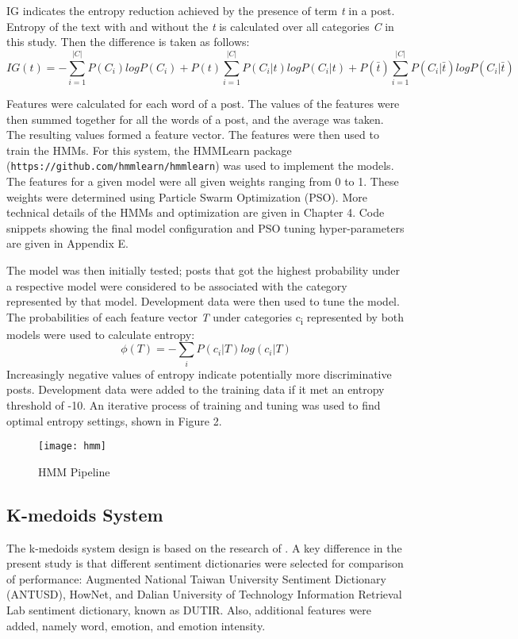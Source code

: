 \documentclass [11pt, proquest] {uwthesis}[2020/02/24]
\begin{document}
IG indicates the entropy reduction achieved by the presence of term \textit{t} in a post. Entropy of the text with and without the \textit{t} is calculated over all categories \textit{C} in this study. Then the difference is taken as follows:
\begin{equation}
IG(t) = - \sum_{i=1}^{\lvert C \rvert}P(C_{i})log P(C_{i}) + P(t)\sum_{i=1}^{\lvert C \rvert}P(C_{i}|t)logP(C_{i}|t) + P(\bar t)\sum_{i=1}^{\lvert C \rvert}P(C_{i}|\bar t)logP(C_{i}|\bar t)
\end{equation}

Features were calculated for each word of a post. The values of the features were then summed together for all the words of a post, and the average was taken. The resulting values formed a feature vector. The features were then used to train the HMMs. 
For this system, the HMMLearn package (\texttt{https://github.com/hmmlearn/hmmlearn}) was used to implement the models. The features for a given model were all given weights ranging from 0 to 1. These weights were determined using Particle Swarm Optimization (PSO). More technical details of the HMMs and optimization are given in Chapter 4. Code snippets showing the final model configuration and PSO tuning hyper-parameters are given in Appendix E.
 
The model was then initially tested; posts that got the highest probability under a respective model were considered to be associated with the category represented by that model. Development data were then used to tune the model. The probabilities of each feature vector \textit{T} under categories c\textsubscript{i} represented by both models were used to calculate entropy:
\begin{equation}
\phi(T) = -\sum_{i}P(c_{i}|T)log(c_{i}|T)
\end{equation}
Increasingly negative values of entropy indicate potentially more discriminative posts. Development data were added to the training data if it met an entropy threshold of -10. An iterative process of training and tuning was used to find optimal entropy settings, shown in Figure 2.

\begin{figure}[hbt!]
\texttt{[image: hmm]}
\caption{HMM Pipeline}
\end{figure}


\subsection{K-medoids System}
The k-medoids system design is based on the research of \cite{Wei2014}. A key difference in the present study is that different sentiment dictionaries were selected for comparison of performance: Augmented National Taiwan University Sentiment Dictionary (ANTUSD), HowNet, and Dalian University of Technology Information Retrieval Lab sentiment dictionary, known as DUTIR. Also, additional features were added, namely word, emotion, and emotion intensity.
\end{document}
